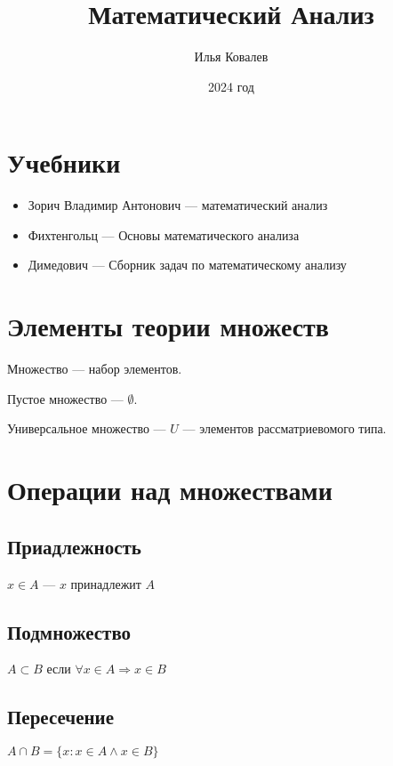\documentclass{article}
\begin{document}
\title{Математический Анализ}
\author{Илья Ковалев}
\date{2024 год}
\maketitle



\section{Учебники}

\begin{itemize}
\item Зорич Владимир Антонович --- математический анализ
\item Фихтенгольц --- Основы математического анализа
\item Димедович --- Сборник задач по математическому анализу
\end{itemize}

\section{Элементы теории множеств}


Множество --- набор элементов.

Пустое множество --- $\emptyset$.

Универсальное множество --- $U$ --- элементов рассматриевомого типа.

\section{Операции над множествами}

\subsection{Приадлежность}

$x \in A$ --- $x$ принадлежит $A$

\subsection{Подмножество}

$A \subset B$ если
$\forall x \in A \Rightarrow x \in B$

\subsection{Пересечение}

$A \cap B = \{x: x \in A \land x \in B\}$
\end{document}

